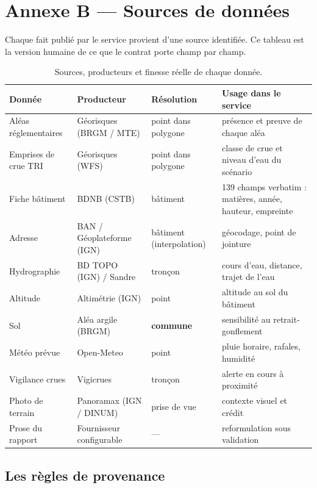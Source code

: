 \chapter{Annexe B — Sources de données}
\label{ann:sources}

Chaque fait publié par le service provient d'une source identifiée. Ce tableau
est la version humaine de ce que le contrat porte champ par champ.

\begin{table}[h]
\centering
\small
\begin{tabularx}{\textwidth}{@{}p{2.9cm}p{3.3cm}p{2.6cm}X@{}}
\toprule
\textbf{Donnée} & \textbf{Producteur} & \textbf{Résolution} & \textbf{Usage dans le service} \\
\midrule
Aléas réglementaires & Géorisques (BRGM / MTE) & point dans polygone & présence et preuve de chaque aléa \\
Emprises de crue TRI & Géorisques (WFS) & point dans polygone & classe de crue et niveau d'eau du scénario \\
Fiche bâtiment & BDNB (CSTB) & bâtiment & 139 champs verbatim : matières, année, hauteur, empreinte \\
Adresse & BAN / Géoplateforme (IGN) & bâtiment (interpolation) & géocodage, point de jointure \\
Hydrographie & BD TOPO (IGN) / Sandre & tronçon & cours d'eau, distance, trajet de l'eau \\
Altitude & Altimétrie (IGN) & point & altitude au sol du bâtiment \\
Sol & Aléa argile (BRGM) & \textbf{commune} & sensibilité au retrait-gonflement \\
Météo prévue & Open-Meteo & point & pluie horaire, rafales, humidité \\
Vigilance crues & Vigicrues & tronçon & alerte en cours à proximité \\
Photo de terrain & Panoramax (IGN / DINUM) & prise de vue & contexte visuel et crédit \\
Prose du rapport & Fournisseur configurable & — & reformulation sous validation \\
\bottomrule
\end{tabularx}
\caption{Sources, producteurs et finesse réelle de chaque donnée.}
\end{table}

\section{Les règles de provenance}


